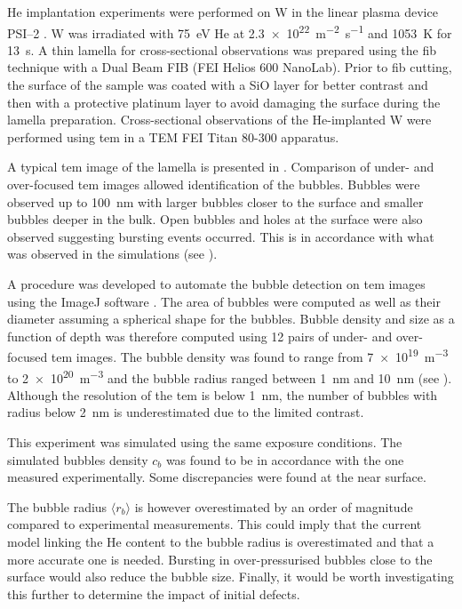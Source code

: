 He implantation experiments were performed on W in the linear plasma device PSI--2 .
W was irradiated with \SI{75}{eV} He at \SI{2.3e22}{m^{-2}.s^{-1}} and \SI{1053}{K} for \SI{13}{s}.
A thin lamella for cross-sectional observations was prepared using the \gls{fib} technique with a Dual Beam FIB (FEI Helios 600 NanoLab).
Prior to \gls{fib} cutting, the surface of the sample was coated with a SiO layer for better contrast and then with a protective platinum layer to avoid damaging the surface during the lamella preparation.
Cross-sectional observations of the He-implanted W were performed using \gls{tem} in a TEM FEI Titan 80-300 apparatus.

A typical \gls{tem} image of the lamella is presented in .
Comparison of under- and over-focused \gls{tem} images allowed identification of the bubbles.
Bubbles were observed up to \SI{100}{nm} with larger bubbles closer to the surface and smaller bubbles deeper in the bulk.
Open bubbles and holes at the surface were also observed suggesting bursting events occurred.
This is in accordance with what was observed in the simulations (see ).

A procedure was developed to automate the bubble detection on \gls{tem} images using the ImageJ software .
The area of bubbles were computed as well as their diameter assuming a spherical shape for the bubbles.
Bubble density and size as a function of depth was therefore computed using 12 pairs of under- and over-focused \gls{tem} images.
The bubble density was found to range from \SI{7e19}{m^{-3}} to \SI{2e20}{m^{-3}} and the bubble radius ranged between \SI{1}{nm} and \SI{10}{nm} (see ).
Although the resolution of the \gls{tem} is below \SI{1}{nm}, the number of bubbles with radius below \SI{2}{nm} is underestimated due to the limited contrast.

This experiment was simulated using the same exposure conditions.
The simulated bubbles density $c_b$ was found to be in accordance with the one measured experimentally.
Some discrepancies were found at the near surface.

The bubble radius $\langle r_b \rangle$ is however overestimated by an order of magnitude compared to experimental measurements.
This could imply that the current model linking the He content to the bubble radius is overestimated and that a more accurate one is needed.
Bursting in over-pressurised bubbles close to the surface would also reduce the bubble size. 
Finally, it would be worth investigating this further to determine the impact of initial defects.
